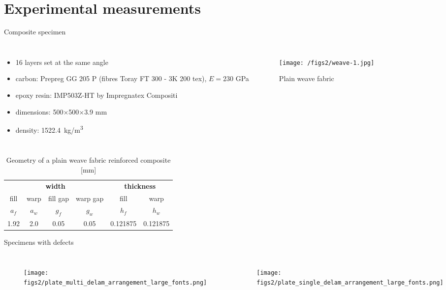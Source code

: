 \documentclass[10pt,aspectratio=169,dvipsnames]{beamer} %
\newcounter{angle}
\begin{document}
\section{Experimental measurements}
\begin{frame}[t]{Composite specimen}
	\begin{columns}[T]
		{\small
			\begin{itemize}
				\item 16 layers set at the same angle \\
				\item carbon: Prepreg GG 205  P (fibres Toray FT 300 - 3K 200 tex), $E=230$ GPa
				\item epoxy resin: IMP503Z-HT by Impregnatex Compositi 
				\item dimensions: 500$\times$500$\times$3.9 mm\\
				\item density: 1522.4~kg/m\textsuperscript{3}
			\end{itemize}
		}
		\begin{figure}
			\texttt{[image: /figs2/weave-1.jpg]}
			\caption{Plain weave fabric}
		\end{figure}
	\end{columns}
	\begin{table}[h]
		\renewcommand{\arraystretch}{1.1}
		\centering \footnotesize
		\caption{Geometry of a plain weave fabric reinforced composite [mm]}
		\begin{tabular}{cccccc} 
			\toprule
			\multicolumn{4}{c}{\textbf{width} }	& \multicolumn{2}{c}{\textbf{thickness} }  \\ 
			\cmidrule(lr){1-4} \cmidrule(lr){5-6} 
			fill & warp & fill gap& warp gap& fill & warp\\
			$a_f$ &$a_w$& $g_f$  & $g_w$  & $h_f$& $h_w$ \\ 
			\cmidrule(lr){1-2} \cmidrule(lr){3-4} \cmidrule(lr){5-6}
			1.92 &2.0& 0.05& 0.05 & 0.121875 & 0.121875 \\
			\bottomrule 
		\end{tabular} 
		\label{tab:weave_geo}
	\end{table}
\end{frame}
\begin{frame}[t]{Specimens with defects}
\vspace{-0.5cm}
\begin{columns}[T]
	\begin{figure}
		\texttt{[image: figs2/plate\_multi\_delam\_arrangement\_large\_fonts.png]}
	\end{figure}
	\begin{figure}
		\texttt{[image: figs2/plate\_single\_delam\_arrangement\_large\_fonts.png]}
	\end{figure}
\end{columns}
\end{frame}
\end{document}
